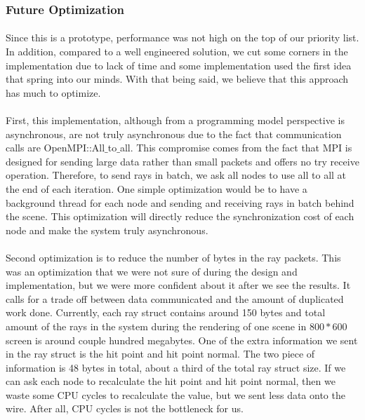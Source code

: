 \documentclass[a4paper, oneside, 10pt]{article}
\begin{document}
\subsubsection{Future Optimization}
\paragraph{} Since this is a prototype, performance was not high on the top of our priority list. In addition, compared to a well engineered solution, we cut some corners in the implementation due to lack of time and some implementation used the first idea that spring into our minds. With that being said, we believe that this approach has much to optimize.
\paragraph{} First, this implementation, although from a programming model perspective is asynchronous, are not truly asynchronous due to the fact that communication calls are OpenMPI::All$\_$to$\_$all.  This compromise comes from the fact that MPI is designed for sending large data rather than small packets and offers no try receive operation. Therefore, to send rays in batch, we ask all nodes to use all to all at the end of each iteration.  One simple optimization would be to have a background thread for each node and sending and receiving rays in batch behind the scene.  This optimization will directly reduce the synchronization cost of each node and make the system truly asynchronous.
\paragraph{} Second optimization is to reduce the number of bytes in the ray packets. This was an optimization that we were not sure of during the design and implementation, but we were more confident about it after we see the results. It calls for a trade off between data communicated and the amount of duplicated work done.  Currently, each ray struct contains around 150 bytes and total amount of the rays in the system during the rendering of one scene in $800 * 600$ screen is around couple hundred megabytes.  One of the extra information we sent in the ray struct is the hit point and hit point normal. The two piece of information is 48 bytes in total, about a third of the total ray struct size.  If we can ask each node to recalculate the hit point and hit point normal, then we waste some CPU cycles to recalculate the value, but we sent less data onto the wire.  After all, CPU cycles is not the bottleneck for us.
\end{document}
